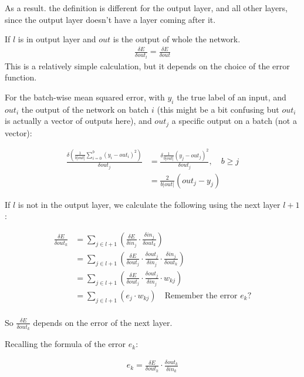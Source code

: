 \documentclass[a4paper, 12pt, finnish]{article}
\begin{document}
  As a result. the definition is different for the output layer, and all other layers, since the output layer doesn't have a layer coming after it.

  If $l$ is in output layer and $out$ is the output of whole the network.
    \begin{align*}
      \frac{\delta E}{\delta out_l} = \frac{\delta E}{\delta out}
  \end{align*}
  This is a relatively simple calculation, but it depends on the choice of the error function.

  For the batch-wise mean squared error, with $y_i$ the true label of an input, and $out_i$ the output of the network on batch $i$ (this might be a bit confusing but $out_i$ is actually a vector of outputs here), and $out_j$ a specific output on a batch (not a vector):

  \begin{align*}
    \frac{\delta \left( \frac{1}{b|out|} \sum^b_{i=0}(y_i - out_i)^2 \right)}{\delta out_j} &= \frac{\delta\frac{1}{b|out|}(y_j - out_j)^2}{\delta out_j}, \quad b \geq j \\
    &= \frac{2}{b|out|}(out_j - y_j)
  \end{align*}

  If $l$ is not in the output layer, we calculate the following using the next layer $l+1$:

  \begin{align*}
    \frac{\delta E}{\delta out_k} &= \sum_{j \in l + 1} \left( \frac{\delta E}{\delta in_j} \cdot \frac{\delta in_j}{\delta out_k}\right) \\
    &= \sum_{j \in l + 1} \left( \frac{\delta E}{\delta out_j} \cdot \frac{\delta out_j}{\delta in_j} \cdot \frac{\delta in_j}{\delta out_k} \right) \\
    &= \sum_{j \in l + 1} \left( \frac{\delta E}{\delta out_j} \cdot \frac{\delta out_j}{\delta in_j} \cdot w_{kj} \right) \\
    &= \sum_{j \in l + 1} \left( e_j \cdot w_{kj} \right) \quad \text{Remember the error $e_k$?}\\
  \end{align*}


So $\frac{\delta E}{\delta out_k}$ depends on the error of the next layer.

Recalling the formula of the error $e_k$:

\begin{align*}
  e_k=\frac{\delta E}{\delta out_k} \cdot \frac{\delta out_k}{\delta in_k}
\end{align*}
\end{document}
